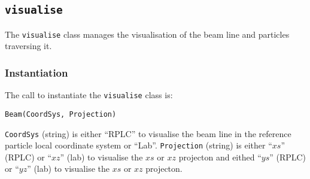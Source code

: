 \subsection{\texttt{visualise}}
\label{SubSect:vis}

The \texttt{visualise} class manages the visualisation of the beam
line and particles traversing it.

\subsubsection{Instantiation}
\noindent
The call to instantiate the \texttt{visualise} class is:
\begin{center}
  \texttt{Beam(CoordSys, Projection)}
\end{center}
\texttt{CoordSys} (string) is either ``RPLC'' to visualise the beam
line in the reference particle local coordinate system or ``Lab''.
\texttt{Projection} (string) is either ``$xs$'' (RPLC) or ``$xz$''
(lab) to visualise the $xs$ or $xz$ projecton and eithed ``$ys$''
(RPLC) or ``$yz$'' (lab) to visualise the $xs$ or $xz$ projecton.


